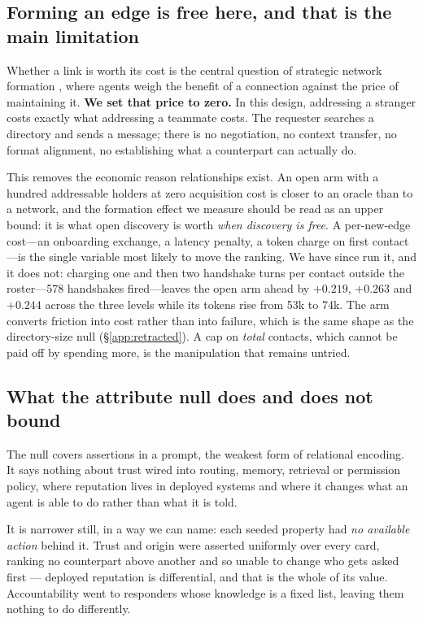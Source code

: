 \subsection{Forming an edge is free here, and that is the main limitation}

Whether a link is worth its cost is the central question of strategic network formation
\citep{jackson1996}, where agents weigh the benefit of a connection against the price of
maintaining it. \textbf{We set that price to zero.} In this design, addressing a stranger
costs exactly what addressing a teammate costs.
The requester searches a directory and sends a message; there is no negotiation, no
context transfer, no format alignment, no establishing what a counterpart can actually
do.

This removes the economic reason relationships exist. An open arm with a hundred
addressable holders at zero acquisition cost is closer to an oracle than to a network,
and the formation effect we measure should be read as an upper bound: it is what open
discovery is worth \emph{when discovery is free}. A per-new-edge cost---an onboarding
exchange, a latency penalty, a token charge on first contact---is the single variable
most likely to move the ranking. We have since run it, and it does not: charging one
and then two handshake turns per contact outside the roster---578 handshakes fired---leaves
the open arm ahead by $+0.219$, $+0.263$ and $+0.244$ across the three levels while its
tokens rise from 53k to 74k. The arm converts friction into cost rather than into failure,
which is the same shape as the directory-size null (\S\ref{app:retracted}). A cap on
\emph{total} contacts, which cannot be paid off by spending more, is the manipulation that
remains untried.

\subsection{What the attribute null does and does not bound}

The null covers assertions in a prompt, the weakest form of relational encoding. It says
nothing about trust wired into routing, memory, retrieval or permission policy, where
reputation lives in deployed systems and where it changes what an agent is able to do
rather than what it is told.

It is narrower still, in a way we can name: each seeded property had \emph{no available
action} behind it. Trust and origin were asserted uniformly over every card, ranking no
counterpart above another and so unable to change who gets asked first --- deployed
reputation is differential, and that is the whole of its value. Accountability went to
responders whose knowledge is a fixed list, leaving them nothing to do differently.


